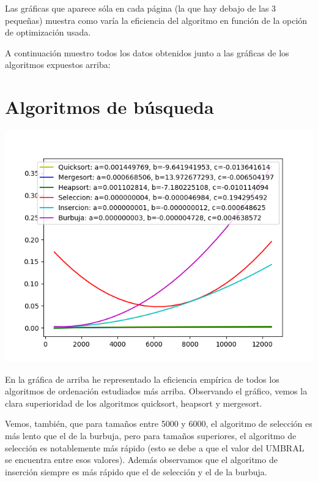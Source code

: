 \documentclass[12pt]{article}
\begin{document}
Las gráficas que aparece sóla en cada página (la que hay debajo de las 3 pequeñas) muestra como varía la eficiencia del algoritmo en función de la opción de optimización usada.

A continuación muestro todos los datos obtenidos junto a las gráficas de los algoritmos expuestos arriba:











\section{Algoritmos de búsqueda}
\begin{center}
\includegraphics[scale=0.6]{../graficos/ordenacion/ordenacion.png}
\end{center}
En la gráfica de arriba he representado la eficiencia empírica de todos los algoritmos de ordenación estudiados más arriba. Observando el gráfico, vemos la clara superioridad de los algoritmos quicksort, heapsort y mergesort. 

Vemos, también, que para tamaños entre 5000 y 6000, el algoritmo de selección es más lento que el de la burbuja, pero para tamaños superiores, el algoritmo de selección es notablemente más rápido (esto se debe a que el valor del UMBRAL se encuentra entre esos valores). Además observamos que el algoritmo de inserción siempre es más rápido que el de selección y el de la burbuja.
\end{document}
